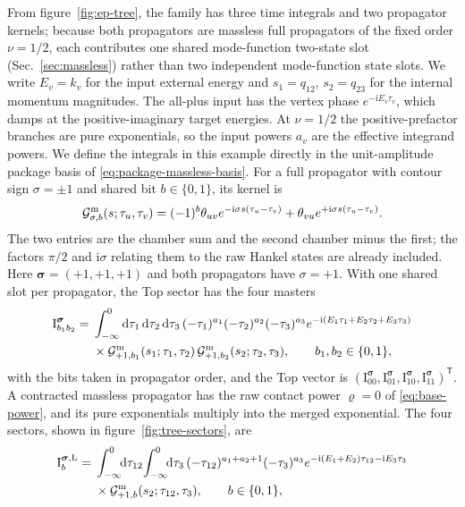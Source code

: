 \documentclass[11pt,a4paper]{article}
\numberwithin{table}{section}
\newcommand{\dd}{\mathrm d}
\newcommand{\ii}{\mathrm i}
\begin{document}
From figure~\ref{fig:ep-tree}, the family has three time integrals and two propagator kernels;
because both propagators are massless full propagators of the fixed order $\nu=1/2$, each
contributes one shared mode-function two-state slot (Sec.~\ref{sec:massless}) rather than two
independent mode-function state slots.
We write $E_v=k_v$ for the input external energy and $s_1=q_{12}$, $s_2=q_{23}$ for
the internal momentum magnitudes. The all-plus input has the vertex phase
$e^{-\ii E_v\tau_v}$, which damps at the positive-imaginary target energies.
At $\nu=1/2$ the positive-prefactor branches are pure exponentials, so the input powers
$a_v$ are the effective integrand powers. We define the integrals in this example directly
in the unit-amplitude package basis of \eqref{eq:package-massless-basis}. For a full
propagator with contour sign $\sigma=\pm1$ and shared bit $b\in\{0,1\}$, its kernel is
\begin{equation}
 \mathcal G^{\rm m}_{\sigma,b}(s;\tau_u,\tau_v)
 =(-1)^b\theta_{uv}e^{-\ii\sigma s(\tau_u-\tau_v)}
  +\theta_{vu}e^{+\ii\sigma s(\tau_u-\tau_v)}.
 \label{eq:ep-massless-kernel}
\end{equation}
The two entries are the chamber sum and the second chamber minus the first; the factors
$\pi/2$ and $\ii\sigma$ relating them to the raw Hankel states are already included.
Here $\boldsymbol\sigma=(+1,+1,+1)$ and both propagators have $\sigma=+1$.
With one shared slot per propagator, the Top sector has the four masters
\begin{equation}
 \begin{aligned}
 \text{I}^{\boldsymbol\sigma}_{b_1b_2}
 ={}&\int_{-\infty}^{0}\dd\tau_1\,\dd\tau_2\,\dd\tau_3\,
 (-\tau_1)^{a_1}(-\tau_2)^{a_2}(-\tau_3)^{a_3}
 e^{-\ii(E_1\tau_1+E_2\tau_2+E_3\tau_3)}\\
 &\times\mathcal G^{\rm m}_{+1,b_1}(s_1;\tau_1,\tau_2)\,
 \mathcal G^{\rm m}_{+1,b_2}(s_2;\tau_2,\tau_3),
 \qquad b_1,b_2\in\{0,1\},
 \end{aligned}
 \label{eq:ep-top-masters}
\end{equation}
with the bits taken in propagator order, and the Top vector is
$(\text{I}^{\boldsymbol\sigma}_{00},\text{I}^{\boldsymbol\sigma}_{01},
\text{I}^{\boldsymbol\sigma}_{10},\text{I}^{\boldsymbol\sigma}_{11})^{\mathsf T}$.
A contracted massless propagator has the raw contact power $\varrho=0$ of \eqref{eq:base-power},
and its pure exponentials multiply into the merged exponential. The four sectors, shown in
figure~\ref{fig:tree-sectors}, are
\begin{equation}
 \begin{aligned}
 \text{I}^{\boldsymbol\sigma,{\rm L}}_{b}
 ={}&\int_{-\infty}^{0}\!\!\dd\tau_{12}\!\int_{-\infty}^{0}\!\!\dd\tau_3\,
 (-\tau_{12})^{a_1+a_2+1}(-\tau_3)^{a_3}
 e^{-\ii(E_1+E_2)\tau_{12}-\ii E_3\tau_3}\\
 &\times\mathcal G^{\rm m}_{+1,b}(s_2;\tau_{12},\tau_3),
 \qquad b\in\{0,1\},
 \end{aligned}
 \label{eq:ep-left-masters}
\end{equation}
\end{document}
